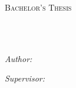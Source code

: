 \documentclass[
11pt, %
english, %
singlespacing, %
headsepline, %
]{MastersDoctoralThesis} %
\author{Albert \textsc{Ribes}} %
\begin{document}
\frontmatter %

\pagestyle{plain} %


\begin{titlepage}
\begin{center}

\vspace*{.06\textheight}
{\scshape\LARGE \univname\par}\vspace{1.5cm} %
\textsc{\Large Bachelor's Thesis}\\[0.5cm] %

\HRule \\[0.4cm] %
{\huge \bfseries \ttitle\par}\vspace{0.4cm} %
\HRule \\[1.5cm] %

\begin{minipage}[t]{0.4\textwidth}
\begin{flushleft} \large
\emph{Author:}\\
\authorname %
\end{flushleft}
\end{minipage}
\begin{minipage}[t]{0.4\textwidth}
\begin{flushright} \large
\emph{Supervisor:} \\
\href{https://www.cs.upc.edu/~belanche/}{\supname} %
\end{flushright}
\end{minipage}\\[3cm]

\vfill

\deptname\\[2cm] %


\end{center}
\end{titlepage}
\end{document}
